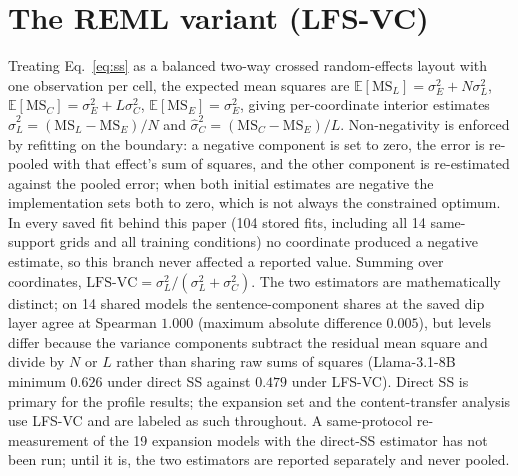 \documentclass{article} %
\begin{document}
\section{The REML variant (LFS-VC)}
\label{app:reml}
Treating Eq.~\ref{eq:ss} as a balanced two-way crossed random-effects layout
with one observation per cell, the expected mean squares are
$\mathbb{E}[\mathrm{MS}_L] = \sigma_E^2 + N\sigma_L^2$,
$\mathbb{E}[\mathrm{MS}_C] = \sigma_E^2 + L\sigma_C^2$,
$\mathbb{E}[\mathrm{MS}_E] = \sigma_E^2$, giving per-coordinate interior estimates $\hat\sigma_L^2 = (\mathrm{MS}_L - \mathrm{MS}_E)/N$ and $\hat\sigma_C^2 = (\mathrm{MS}_C - \mathrm{MS}_E)/L$. Non-negativity is enforced by refitting on the boundary: a negative component is set to zero, the error is re-pooled with that effect's sum of squares, and the other component is re-estimated against the pooled error; when both initial estimates are negative the implementation sets both to zero, which is not always the constrained optimum. In every saved fit behind this paper (104 stored fits, including all 14 same-support grids and all training conditions) no coordinate produced a negative estimate, so this branch never affected a reported value. Summing over coordinates,
$\mathrm{LFS\mbox{-}VC} = \sigma_L^2/(\sigma_L^2 + \sigma_C^2)$. The two
estimators are mathematically distinct; on 14 shared models the sentence-component shares at the saved dip layer agree at Spearman $1.000$ (maximum absolute difference $0.005$), but levels differ because the variance components subtract the residual mean square and divide by $N$ or $L$ rather than sharing raw sums of squares (Llama-3.1-8B minimum $0.626$ under direct SS
against $0.479$ under LFS-VC). Direct SS is primary for the profile results;
the expansion set and the content-transfer analysis use LFS-VC and are labeled
as such throughout. A same-protocol re-measurement of the 19 expansion models
with the direct-SS estimator has not been run; until it is, the two estimators
are reported separately and never pooled.
\end{document}
